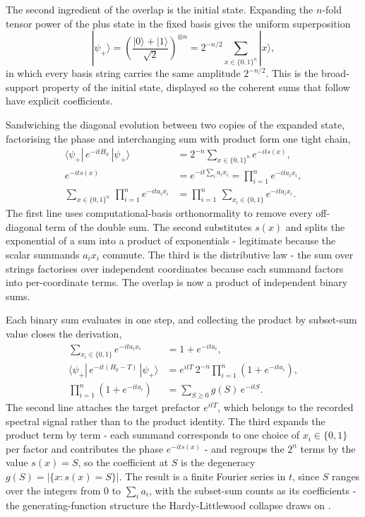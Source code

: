The second ingredient of the overlap is the initial state. Expanding the $n$-fold tensor power of the plus state in the fixed basis gives the uniform superposition
\begin{equation*}
|\psi_+\rangle = \left( \frac{|0\rangle + |1\rangle}{\sqrt{2}} \right)^{\otimes n}
= 2^{-n/2} \sum_{x \in \{0,1\}^n} |x\rangle ,
\end{equation*}
in which every basis string carries the same amplitude $2^{-n/2}$. This is the broad-support property of the initial state, displayed so the coherent sums that follow have explicit coefficients.

Sandwiching the diagonal evolution between two copies of the expanded state, factorising the phase and interchanging sum with product form one tight chain,
\begin{align*}
\langle \psi_+ | \, e^{-i t H_0} \, | \psi_+ \rangle
&= 2^{-n} \sum_{x \in \{0,1\}^n} e^{-i t s(x)} , \\
e^{-i t s(x)} &= e^{-i t \sum_i a_i x_i} = \prod_{i=1}^{n} e^{-i t a_i x_i} , \\
\sum_{x \in \{0,1\}^n} \, \prod_{i=1}^{n} e^{-i t a_i x_i}
&= \prod_{i=1}^{n} \, \sum_{x_i \in \{0,1\}} e^{-i t a_i x_i} .
\end{align*}
The first line uses computational-basis orthonormality to remove every off-diagonal term of the double sum. The second substitutes $s(x)$ and splits the exponential of a sum into a product of exponentials - legitimate because the scalar summands $a_i x_i$ commute. The third is the distributive law - the sum over strings factorises over independent coordinates because each summand factors into per-coordinate terms. The overlap is now a product of independent binary sums.

Each binary sum evaluates in one step, and collecting the product by subset-sum value closes the derivation,
\begin{align*}
\sum_{x_i \in \{0,1\}} e^{-i t a_i x_i} &= 1 + e^{-i t a_i} , \\
\langle \psi_+ | \, e^{-i t (H_0 - T)} \, | \psi_+ \rangle
&= e^{i t T} \, 2^{-n} \prod_{i=1}^{n} \left( 1 + e^{-i t a_i} \right) , \\
\prod_{i=1}^{n} \left( 1 + e^{-i t a_i} \right)
&= \sum_{S \ge 0} g(S) \, e^{-i t S} .
\end{align*}
The second line attaches the target prefactor $e^{i t T}$, which belongs to the recorded spectral signal rather than to the product identity. The third expands the product term by term - each summand corresponds to one choice of $x_i \in \{0,1\}$ per factor and contributes the phase $e^{-i t s(x)}$ - and regroups the $2^n$ terms by the value $s(x) = S$, so the coefficient at $S$ is the degeneracy $g(S) = |\{ x : s(x) = S \}|$. The result is a finite Fourier series in $t$, since $S$ ranges over the integers from $0$ to $\sum_i a_i$, with the subset-sum counts as its coefficients - the generating-function structure the Hardy-Littlewood collapse draws on \cite{vaughan1997hardy}.

